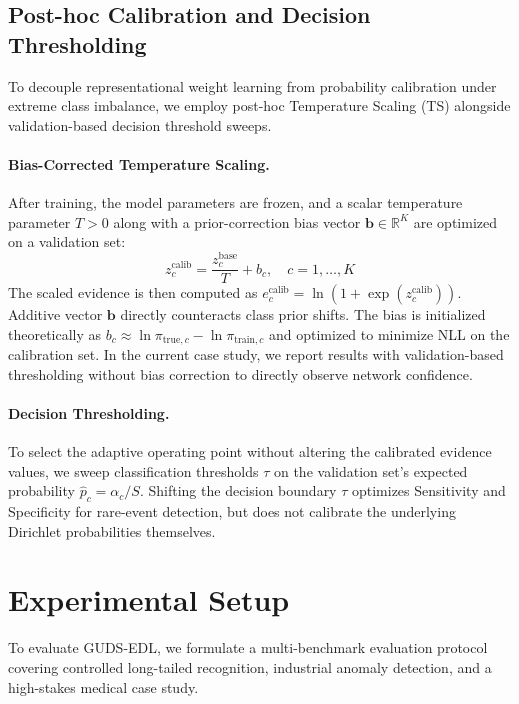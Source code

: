 \documentclass[letterpaper]{article} %
\newcommand{\R}{\mathbb{R}}
\begin{document}
\subsection{Post-hoc Calibration and Decision Thresholding}
To decouple representational weight learning from probability calibration under extreme class imbalance, we employ post-hoc Temperature Scaling (TS) \cite{guo2017calibration} alongside validation-based decision threshold sweeps.

\paragraph{Bias-Corrected Temperature Scaling.} After training, the model parameters are frozen, and a scalar temperature parameter $T > 0$ along with a prior-correction bias vector $\bm{b} \in \R^K$ are optimized on a validation set:
\begin{equation}
    z^{\text{calib}}_c = \frac{z^{\text{base}}_c}{T} + b_c, \quad c = 1, \ldots, K
\end{equation}
The scaled evidence is then computed as $e^{\text{calib}}_c = \ln(1 + \exp(z^{\text{calib}}_c))$. Additive vector $\bm{b}$ directly counteracts class prior shifts. The bias is initialized theoretically as $b_c \approx \ln \pi_{\text{true},c} - \ln \pi_{\text{train},c}$ and optimized to minimize NLL on the calibration set. In the current case study, we report results with validation-based thresholding without bias correction to directly observe network confidence.

\paragraph{Decision Thresholding.} To select the adaptive operating point without altering the calibrated evidence values, we sweep classification thresholds $\tau$ on the validation set's expected probability $\hat{p}_c = \alpha_c/S$. Shifting the decision boundary $\tau$ optimizes Sensitivity and Specificity for rare-event detection, but does not calibrate the underlying Dirichlet probabilities themselves.

\section{Experimental Setup}\label{sec:experiment}

To evaluate GUDS-EDL, we formulate a multi-benchmark evaluation protocol covering controlled long-tailed recognition, industrial anomaly detection, and a high-stakes medical case study.
\end{document}
